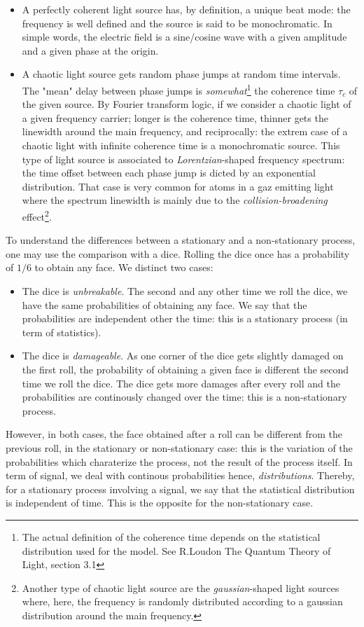 \documentclass[10pt]{report}
\begin{document}
\begin{itemize}
	\item A perfectly coherent light source has, by definition, a unique beat mode: the frequency is well defined and the source is said to be monochromatic. In simple words, the electric field is a sine/cosine wave with a given amplitude and a given phase at the origin.
	\item A chaotic light source gets random phase jumps at random time intervals. The "mean" delay between phase jumps is \textit{somewhat}\footnote{The actual definition of the coherence time depends on the statistical distribution used for the model. See R.Loudon The Quantum Theory of Light, section 3.1} the coherence time $\tau_c$ of the given source. By Fourier transform logic, if we consider a chaotic light of a given frequency carrier; longer is the coherence time, thinner gets the linewidth around the main frequency, and reciprocally: the extrem case of a chaotic light with infinite coherence time is a monochromatic source. This type of light source is associated to \textit{Lorentzian}-shaped frequency spectrum: the time offset between each phase jump is dicted by an exponential distribution. That case is very common for atoms in a gaz emitting light where the spectrum linewidth is mainly due to the \textit{collision-broadening} effect\footnote{Another type of chaotic light source are the \textit{gaussian}-shaped light sources where, here, the frequency is randomly distributed according to a gaussian distribution around the main frequency.}.
\end{itemize}

To understand the differences between a stationary and a non-stationary process, one may use the comparison with a dice. Rolling the dice once has a probability  of $1/6$ to obtain any face. We distinct two cases:
\begin{itemize}
	\item The dice is \textit{unbreakable}. The second and any other time we roll the dice, we have the same probabilities of obtaining any face. We say that the probabilities are independent other the time: this is a stationary process (in term of statistics).
	\item The dice is \textit{damageable}. As one corner of the dice gets slightly damaged on the first roll, the probability of obtaining a given face is different the second time we roll the dice. The dice gets more damages after every roll and the probabilities are continously changed over the time: this is a non-stationary process.
\end{itemize}
However, in both cases, the face obtained after a roll can be different from the previous roll, in the stationary or non-stationary case: this is the variation of the probabilities which charaterize the process, not the result of the process itself. In term of signal, we deal with continous probabilities hence, \textit{distributions}. Thereby, for a stationary process involving a signal, we say that the statistical distribution is independent of time. This is the opposite for the non-stationary case.
\end{document}
